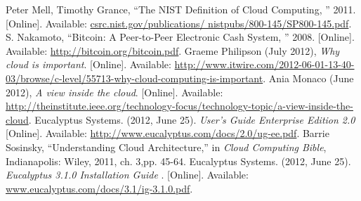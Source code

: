 \documentclass[a4page,12pt]{article}
\begin{document}
\pagebreak
\begin{thebibliography}{xx}
Peter Mell, Timothy Grance, ``The NIST Definition of Cloud Computing, '' 2011. [Online]. Available: \url{csrc.nist.gov/publications/ nistpubs/800-145/SP800-145.pdf}.
S. Nakamoto, ``Bitcoin: A Peer-to-Peer Electronic Cash System, '' 2008. [Online]. Available: \url{http://bitcoin.org/bitcoin.pdf}. 
Graeme Philipson (July 2012), \textit{Why cloud is important}. [Online]. Available: \url{http://www.itwire.com/2012-06-01-13-40-03/browse/c-level/55713-why-cloud-computing-is-important}.
Ania  Monaco (June 2012), \textit{A view inside the cloud}. [Online]. Available: 
\url{http://theinstitute.ieee.org/technology-focus/technology-topic/a-view-inside-the-cloud}.
Eucalyptus Systems. (2012, June 25). \textit{User's Guide Enterprise Edition 2.0}
[Online]. Available: \url{http://www.eucalyptus.com/docs/2.0/ug-ee.pdf}.
Barrie Sosinsky, ``Understanding Cloud Architecture,'' in \textit{Cloud Computing Bible}, Indianapolis: Wiley, 2011, ch. 3,pp. 45-64.
Eucalyptus Systems. (2012, June 25). \textit{Eucalyptus 3.1.0 Installation Guide} . [Online]. Available:
\url{www.eucalyptus.com/docs/3.1/ig-3.1.0.pdf}.
\end{thebibliography}
\end{document}
